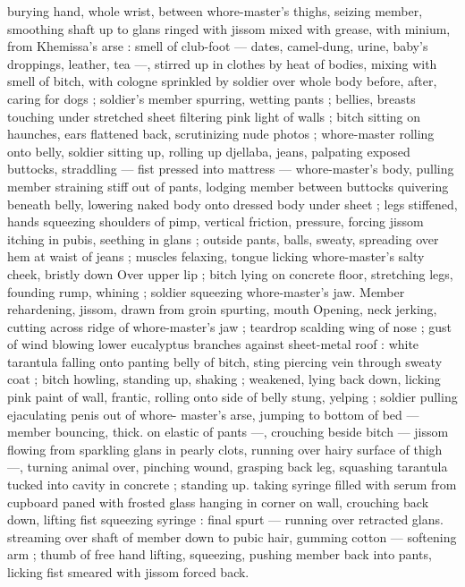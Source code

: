 burying hand, whole wrist, between whore-master's thighs, seizing 
member, smoothing shaft up to glans ringed with jissom mixed with 
grease, with minium, from Khemissa's arse : smell of club-foot --- 
dates, camel-dung, urine, baby's droppings, leather, tea ---, stirred 
up in clothes by heat of bodies, mixing with smell of bitch, with 
cologne sprinkled by soldier over whole body before, after, caring for 
dogs ; soldier's member spurring, wetting pants ; bellies, breasts 
touching under stretched sheet filtering pink light of walls ; bitch 
sitting on haunches, ears flattened back, scrutinizing nude photos ; 
whore-master rolling onto belly, soldier sitting up, rolling up djellaba, 
jeans, palpating exposed buttocks, straddling --- fist pressed into 
mattress --- whore-master's body, pulling member straining stiff out 
of pants, lodging member between buttocks quivering beneath belly, 
lowering naked body onto dressed body under sheet ; legs stiffened, 
hands squeezing shoulders of pimp, vertical friction, pressure, 
forcing jissom itching in pubis, seething in glans ; outside pants, 
balls, sweaty, spreading over hem at waist of jeans ; muscles 
felaxing, tongue licking whore-master's salty cheek, bristly down 
Over upper lip ; bitch lying on concrete floor, stretching legs, 
founding rump, whining ; soldier squeezing whore-master's jaw. 
Member rehardening, jissom, drawn from groin spurting, mouth 
Opening, neck jerking, cutting across ridge of whore-master's jaw ; 
teardrop scalding wing of nose ; gust of wind blowing lower 
eucalyptus branches against sheet-metal roof : white tarantula 
falling onto panting belly of bitch, sting piercing vein through sweaty 
coat ; bitch howling, standing up, shaking ; weakened, lying back 
down, licking pink paint of wall, frantic, rolling onto side of belly 
stung, yelping ; soldier pulling ejaculating penis out of whore- 
master's arse, jumping to bottom of bed --- member bouncing, thick. 
on elastic of pants ---, crouching beside bitch --- jissom flowing from 
sparkling glans in pearly clots, running over hairy surface of thigh 
---, turning animal over, pinching wound, grasping back leg, 
squashing tarantula tucked into cavity in concrete ; standing up. 
taking syringe filled with serum from cupboard paned with frosted 
glass hanging in corner on wall, crouching back down, lifting fist 
squeezing syringe : final spurt --- running over retracted glans. 
streaming over shaft of member down to pubic hair, gumming cotton 
--- softening arm ; thumb of free hand lifting, squeezing, pushing 
member back into pants, licking fist smeared with jissom forced back. 
